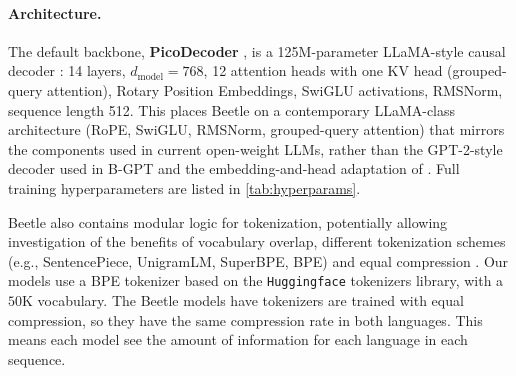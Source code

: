 \documentclass[11pt]{article}
\newcommand{\beetle}{Beetle} %
\begin{document}
\paragraph{Architecture.} The default backbone, \textbf{PicoDecoder} \citep{diehl-martinez-etal-2025-pico}, is a 125M-parameter LLaMA-style causal decoder \citep{touvron2023llama}: 14 layers, $d_{\mathrm{model}}=768$, 12 attention heads with one KV head (grouped-query attention), Rotary Position Embeddings, SwiGLU activations, RMSNorm, sequence length 512. This places \beetle{} on a contemporary LLaMA-class architecture (RoPE, SwiGLU, RMSNorm, grouped-query attention) that mirrors the components used in current open-weight LLMs, rather than the GPT-2-style decoder used in B-GPT \citep{arnett-etal-2025-acquisition} and the embedding-and-head adaptation of \citet{aoyama2024modeling}. Full training hyperparameters are listed in \autoref{tab:hyperparams}.

\beetle{} also contains modular logic for tokenization, potentially allowing investigation of the benefits of vocabulary overlap, different tokenization schemes (e.g., SentencePiece, UnigramLM, SuperBPE, BPE) and equal compression \citep{kallini-etal-2025-false}.  Our models use a BPE tokenizer based on the \texttt{Huggingface} tokenizers library, with a $50$K vocabulary. 
The \beetle{} models have tokenizers are trained with equal compression, so they have the same compression rate in both languages.
This means each model see the amount of information for each language in each sequence.



 
\end{document}
